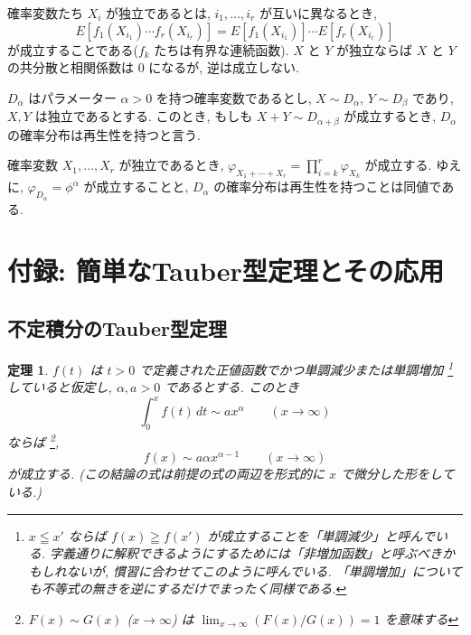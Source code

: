 \documentclass[12pt,twoside]{jarticle}
\theoremstyle{jplain}
\newtheorem{theorem}{定理}
\theoremstyle{jplain}
\theoremstyle{jplain}
\numberwithin{theorem}{section}
\numberwithin{equation}{section}
\numberwithin{figure}{section}
\numberwithin{table}{section}
\begin{document}
確率変数たち $X_i$ が独立であるとは, 
$i_1,\ldots,i_r$ が互いに異なるとき, 
\[
E[f_1(X_{i_1})\cdots f_r(X_{i_r})]
=
E[f_1(X_{i_1})]\cdots E[f_r(X_{i_r})]
\]
が成立することである($f_k$ たちは有界な連続函数).
$X$ と $Y$ が独立ならば $X$ と $Y$ の共分散と相関係数は $0$ になるが, 
逆は成立しない.

$D_\alpha$ はパラメーター $\alpha>0$ を持つ確率変数であるとし, 
$X\sim D_\alpha$, $Y\sim D_\beta$ であり, $X,Y$ は独立であるとする.
このとき, もしも $X+Y\sim D_{\alpha+\beta}$ が成立するとき, 
$D_\alpha$ の確率分布は再生性を持つと言う.

確率変数 $X_1,\ldots,X_r$ が独立であるとき, 
$\varphi_{X_1+\cdots+X_r}=\prod_{i=k}^r\varphi_{X_k}$ が成立する.
ゆえに, $\varphi_{D_\alpha}=\phi^\alpha$ が成立することと,  
$D_\alpha$ の確率分布は再生性を持つことは同値である.


\section{付録: 簡単なTauber型定理とその応用}
\label{sec:Tauber}

\subsection{不定積分のTauber型定理}

\begin{theorem}
$f(t)$ は $t>0$ で定義された正値函数でかつ単調減少または単調増加%
\footnote{$x\leqq x'$ ならば $f(x)\geqq f(x')$ が成立することを「単調減少」と呼んでいる.
字義通りに解釈できるようにするためには「非増加函数」と呼ぶべきかもしれないが, 
慣習に合わせてこのように呼んでいる. 
「単調増加」についても不等式の無きを逆にするだけでまったく同様である.}%
していると仮定し, $\alpha,a>0$ であるとする. このとき
\[
\int_0^x f(t)\,dt \sim a x^\alpha \qquad (x\to\infty)
\]
ならば%
\footnote{$F(x)\sim G(x)$ ($x\to\infty$) は 
$\lim_{x\to\infty}(F(x)/G(x))=1$ を意味する},
\[
f(x) \sim a \alpha x^{\alpha-1} \qquad (x\to\infty)
\]
が成立する. (この結論の式は前提の式の両辺を形式的に $x$ で微分した形をしている.)
\end{theorem}
\end{document}

